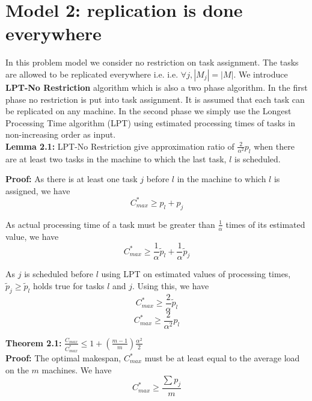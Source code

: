 \documentclass[10pt, conference, compsocconf]{IEEEtran}
\begin{document}
\section{Model 2: replication is done everywhere}

In this problem model we consider no restriction on task assignment. The tasks are allowed to be replicated everywhere i.e. i.e. $\forall j, |M_{j}|=|M|$. We introduce \textbf{LPT-No Restriction }algorithm which is also a two phase algorithm. In the first phase no restriction is put into
task assignment. It is assumed that each task can be replicated on any machine. In the second phase we simply use the Longest Processing Time algorithm (LPT) using estimated processing times of tasks in non-increasing order as input.\\

\textbf{Lemma 2.1:} LPT-No Restriction give approximation ratio of $ {\frac{2}{\alpha^{2}}} p_l $ when there are at least two tasks in
the machine to which the last task, $l$ is scheduled. 

\textbf{Proof:} 
As there is at least one task $j$ before $l$ in the machine to which $l$ is assigned, we have
\begin{equation}\nonumber
C_{max}^{*}\geq p_l + p_j
\end{equation}	

As actual processing time of a task must be greater than $\frac{1}{\alpha}$ times of its estimated value, we have
\begin{equation}\nonumber 
C_{max}^{*} \geq \frac{1}{\alpha}\tilde p_l +  \frac{1}{\alpha} \tilde p_j 
\end{equation}

As $j$ is scheduled before $l$ using LPT on estimated values of processing times,  $\tilde p_j\geq   \tilde p_l$ holds true for tasks $l$ and $j$.  Using this, we have
\begin{equation}\nonumber
 C_{max}^{*} \geq \frac{2}{\alpha}\tilde p_l
 \end{equation}
\begin{equation}
 C_{max}^{*} \geq {\frac{2}{\alpha^{2}}} p_l  \end{equation}


\textbf{Theorem 2.1:} $\frac{C_{max}}{C_{max}^{*}} \leq 1 + (\frac{m-1}{m})\frac{\alpha^{2}}{2}$\\

\textbf{Proof:} The optimal makespan, $C_{max}^{*}$ must be at least equal to the average load on the $m$ machines. We have\\
\begin{equation}
C_{max}^{*}\geq\frac{\sum p_j}{m}
\end{equation}
\end{document}
